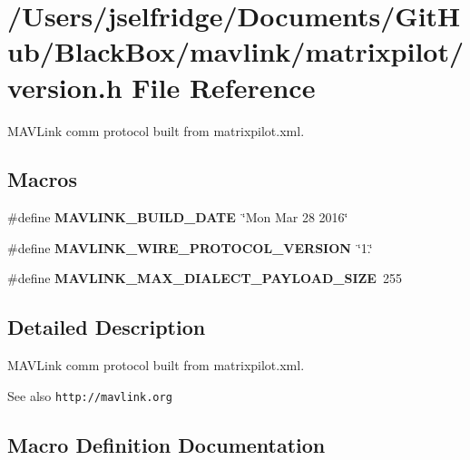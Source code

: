 \section{/\+Users/jselfridge/\+Documents/\+Git\+Hub/\+Black\+Box/mavlink/matrixpilot/version.h File Reference}
\label{matrixpilot_2version_8h}


M\+A\+V\+Link comm protocol built from matrixpilot.\+xml.  


\subsection*{Macros}
\begin{DoxyCompactItemize}
\item 
\#define \textbf{ M\+A\+V\+L\+I\+N\+K\+\_\+\+B\+U\+I\+L\+D\+\_\+\+D\+A\+TE}~\char`\"{}Mon Mar 28 2016\char`\"{}
\item 
\#define \textbf{ M\+A\+V\+L\+I\+N\+K\+\_\+\+W\+I\+R\+E\+\_\+\+P\+R\+O\+T\+O\+C\+O\+L\+\_\+\+V\+E\+R\+S\+I\+ON}~\char`\"{}1.\char`\"{}
\item 
\#define \textbf{ M\+A\+V\+L\+I\+N\+K\+\_\+\+M\+A\+X\+\_\+\+D\+I\+A\+L\+E\+C\+T\+\_\+\+P\+A\+Y\+L\+O\+A\+D\+\_\+\+S\+I\+ZE}~255
\end{DoxyCompactItemize}


\subsection{Detailed Description}
M\+A\+V\+Link comm protocol built from matrixpilot.\+xml. 

\begin{DoxySeeAlso}{See also}
{\tt http\+://mavlink.\+org} 
\end{DoxySeeAlso}


\subsection{Macro Definition Documentation}
\mbox{\label{matrixpilot_2version_8h_ab31250f0c93f71e42393b68a7cfe7585}} 
